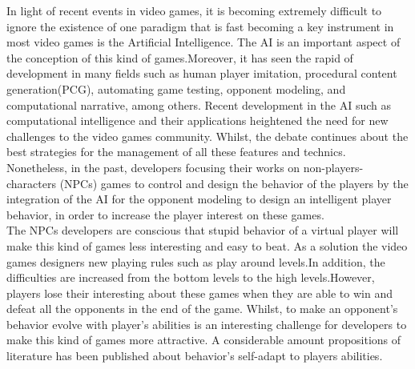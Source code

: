 \documentclass[conference]{IEEEtran}
\begin{document}
In light of recent events in video games, it is becoming extremely difficult to ignore the existence of one paradigm that is fast becoming a key instrument in most video games is the Artificial Intelligence. The AI is an important aspect of the conception of this kind of games.Moreover, it has seen the rapid of development in many fields such as human player imitation, procedural content generation(PCG), automating game testing, opponent modeling, and computational narrative, among others.\cite{doc5} Recent development in the AI such as computational intelligence and their applications heightened the need for new challenges to the video games community. Whilst, the debate continues about the best strategies for the management of all these features and technics.\cite{doc5} Nonetheless, in the past, developers focusing their works on non-players-characters (NPCs) games to control and design the behavior of the players by the integration of the AI for the opponent modeling to design an intelligent player behavior, in order to increase the player interest on these games.\cite{doc5} \\

The NPCs developers are conscious that stupid behavior of a virtual player will make this kind of games less interesting and easy to beat. As a solution the video games designers new playing rules such as play around levels.In addition, the difficulties are increased from the bottom levels to the high levels.However, players lose their interesting about these games when they are able to win and defeat all the opponents in the end of the game. Whilst, to make an opponent's behavior evolve with player's abilities is an interesting challenge for developers to make this kind of games more attractive. A considerable amount propositions of literature has been published about behavior's self-adapt to players abilities.\cite{doc5}\\
\end{document}
